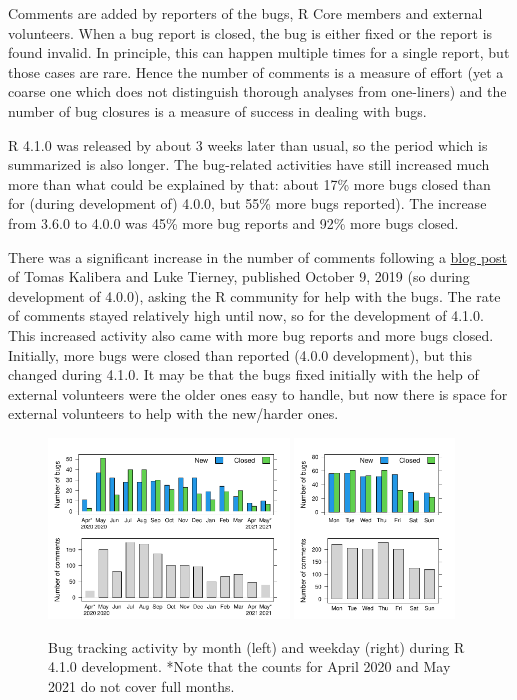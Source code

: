Comments are added by reporters of the bugs, R Core members and external
volunteers.  When a bug report is closed, the bug is either fixed or the
report is found invalid.  In principle, this can happen multiple times for a
single report, but those cases are rare.  Hence the number of comments is a
measure of effort (yet a coarse one which does not distinguish thorough
analyses from one-liners) and the number of bug closures is a measure of
success in dealing with bugs.

R 4.1.0 was released by about 3 weeks later than usual, so the period which
is summarized is also longer.  The bug-related activities have still
increased much more than what could be explained by that: about 17\% more
bugs closed than for (during development of) 4.0.0, but 55\% more bugs
reported).  The increase from 3.6.0 to 4.0.0 was 45\% more bug reports and
92\% more bugs closed.

There was a significant increase in the number of comments following a
\href{https://developer.r-project.org/Blog/public/2019/10/09/r-can-use-your-help-reviewing-bug-reports}{blog
post} of Tomas Kalibera and Luke Tierney, published October 9, 2019 (so
during development of 4.0.0), asking the R community for help with the bugs. 
The rate of comments stayed relatively high until now, so for the
development of 4.1.0.  This increased activity also came with more bug
reports and more bugs closed.  Initially, more bugs were closed than
reported (4.0.0 development), but this changed during 4.1.0.  It may be that
the bugs fixed initially with the help of external volunteers were the older
ones easy to handle, but now there is space for external volunteers to help
with the new/harder ones.

\begin{figure}[htb]
\centering
\includegraphics[width=0.57\textwidth]{apiplot_mon}
\includegraphics[width=0.38\textwidth]{apiplot_wd}
\caption{Bug tracking activity by month (left) and weekday (right) during R
4.1.0 development.  *Note that the counts for April 2020 and May 2021 do not
cover full months.
}
\label{fig:bz41}
\end{figure}

